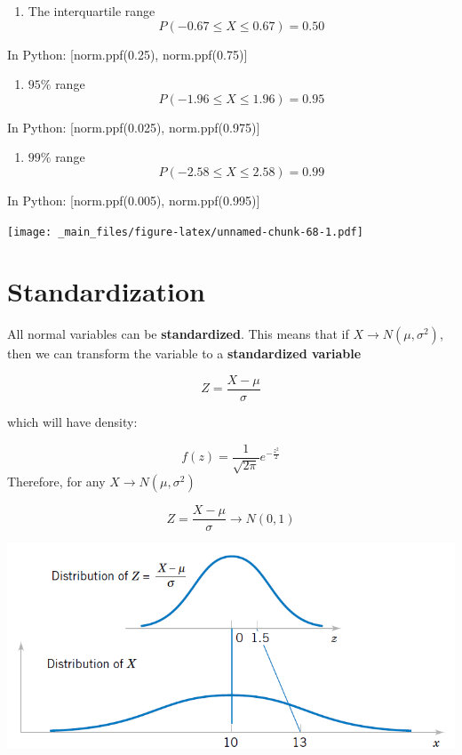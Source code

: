 \documentclass[
]{book}
\providecommand{\tightlist}{%
  \setlength{\itemsep}{0pt}\setlength{\parskip}{0pt}}
\begin{document}
\begin{enumerate}
\def\labelenumi{\arabic{enumi})}
\tightlist
\item
  The interquartile range \[P(-0.67 \leq X \leq 0.67)=0.50\]
\end{enumerate}

In Python: {[}norm.ppf(0.25), norm.ppf(0.75){]}

\begin{enumerate}
\def\labelenumi{\arabic{enumi})}
\setcounter{enumi}{1}
\tightlist
\item
  \(95\%\) range \[P(-1.96 \leq X \leq 1.96)=0.95\]
\end{enumerate}

In Python: {[}norm.ppf(0.025), norm.ppf(0.975){]}

\begin{enumerate}
\def\labelenumi{\arabic{enumi})}
\setcounter{enumi}{2}
\tightlist
\item
  \(99\%\) range \[P(-2.58 \leq X \leq 2.58)=0.99\]
\end{enumerate}

In Python: {[}norm.ppf(0.005), norm.ppf(0.995){]}

\texttt{[image: \_main\_files/figure-latex/unnamed-chunk-68-1.pdf]}

\hypertarget{standardization}{%
\section{Standardization}\label{standardization}}

All normal variables can be \textbf{standardized}. This means that if \(X \rightarrow N(\mu, \sigma^2)\), then we can transform the variable to
a \textbf{standardized variable}

\[Z=\frac{X-\mu}{\sigma}\]

which will have density:

\[f(z)=\frac{1}{ \sqrt{2\pi}}e^{-\frac{z^2}{2}}\]
Therefore, for any \(X \rightarrow N(\mu, \sigma^2)\)

\[Z=\frac{X-\mu}{\sigma} \rightarrow N(0, 1) \]

\includegraphics{./figures/stand.png}
\end{document}
